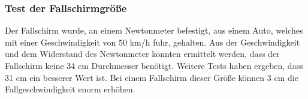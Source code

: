 \subsubsection{Test der Fallschirmgröße}
Der Fallschirm wurde, an einem Newtonmeter befestigt, aus einem Auto, welches mit einer Geschwindigkeit von 50 km/h fuhr, gehalten. Aus der Geschwindigkeit und dem Widerstand des Newtonmeter konnten ermittelt werden, dass der Fallschirm keine 34 cm Durchmesser benötigt. Weitere Tests haben ergeben, dass 31 cm ein besserer Wert ist. Bei einem Fallschirm dieser Größe können 3 cm die Fallgeschwindigkeit enorm erhöhen.
